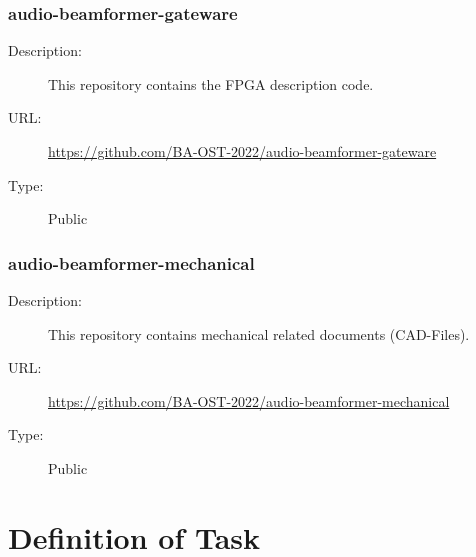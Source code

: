 \subsubsection{audio-beamformer-gateware} \vspace{-0.2cm}
\begin{description}
  \item[Description:] This repository contains the FPGA description code.\vspace{-0.25cm}
  \item[URL:] \url{https://github.com/BA-OST-2022/audio-beamformer-gateware}\vspace{-0.25cm}
  \item[Type:] Public\vspace{-0.25cm}
\end{description}

\subsubsection{audio-beamformer-mechanical} \vspace{-0.2cm}
\begin{description}
  \item[Description:] This repository contains mechanical related documents (CAD-Files).\vspace{-0.25cm}
  \item[URL:] \url{https://github.com/BA-OST-2022/audio-beamformer-mechanical}\vspace{-0.25cm}
  \item[Type:] Public\vspace{-0.25cm}
\end{description}
\newpage

\section{Definition of Task} \label{definition_of_task}
\enlargethispage{2.5cm}
\begin{adjustwidth}{0.23cm}{0cm} \hfuzz=7.0pt \vfuzz=19.0pt
\end{adjustwidth}
\newpage

\begin{adjustwidth}{-0.23cm}{0cm} \hfuzz=7.0pt \vfuzz=19.0pt
\end{adjustwidth}
\newpage

